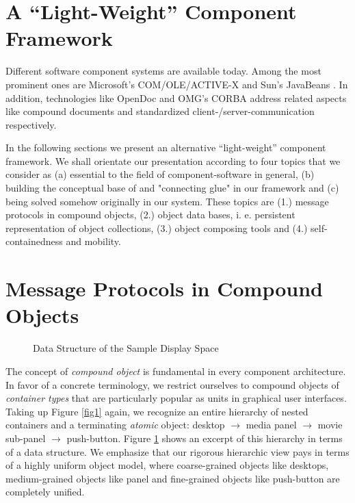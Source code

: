 \section{A ``Light-Weight'' Component Framework}

Different software component systems are available today. Among the
most prominent ones are Microsoft's COM/OLE/ACTIVE-X \cite{8} and
Sun's JavaBeans \cite{9}. In addition, technologies like OpenDoc \cite{10}
and OMG's CORBA \cite{11} address related aspects like compound
documents and standardized client-/server-communication respectively.

\ein
In the following sections we present an alternative ``light-weight'' component
framework. We shall orientate our presentation according to four topics that
we consider as (a) essential to the field of component-software in general,
(b) building the conceptual base of and "connecting glue" in our framework and
(c) being solved somehow originally in our system. These topics are (1.)
message
protocols in compound objects, (2.) object data bases, i. e. persistent
representation
of object collections, (3.) object composing tools and (4.) self-containedness
and
mobility.

\section{Message Protocols in Compound Objects}

\begin{figure}[ht]
\begin{center}
\leavevmode
\epsfxsize=12.0cm
\epsfysize=8.45cm
\caption{Data Structure of the Sample Display Space}
\label{fig2}
\end{center}
\end{figure}

\ein
The concept of {\em compound object\/} is fundamental in every component
architecture. In favor of a concrete terminology, we restrict ourselves to
compound objects of {\em container types} that are particularly popular
as units in graphical user interfaces.
Taking up Figure \ref{fig1} again, we recognize an entire hierarchy of nested
containers and a terminating {\em atomic\/} object: desktop $\to$ media
panel $\to$ movie sub-panel $\to$ push-button. Figure \ref{fig2} shows
an excerpt of this hierarchy in terms of a data structure. We emphasize that
our rigorous hierarchic view pays in terms of a highly uniform object model,
where coarse-grained objects like desktops, medium-grained
objects like panel and fine-grained objects like push-button are completely
unified.
 
